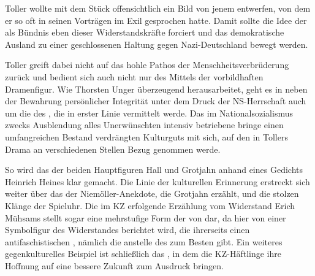 Toller wollte mit dem Stück offensichtlich ein Bild von jenem  entwerfen, von dem er so oft in seinen Vorträgen im Exil gesprochen
hatte.
Damit sollte die Idee der \Cite{Volksfront} als Bündnis eben dieser Widerstandskräfte
forciert und das demokratische Ausland zu einer geschlossenen Haltung gegen
Nazi-Deutschland bewegt werden.

Toller greift dabei nicht auf das hohle Pathos der Menschheitsverbrüderung
zurück und bedient sich auch nicht nur des Mittels der vorbildhaften
Dramenfigur. Wie Thorsten Unger überzeugend herausarbeitet, geht es in
 neben der Bewahrung persönlicher Integrität unter dem
Druck der NS-Herrschaft auch um die \Cite{kulturelle Integrität} des
, die in erster Linie \Cite{auf dem Wege der
  intertextuellen Erinnerung} vermittelt werde.
 Das im Nationalsozialismus
zwecks Ausblendung alles Unerwünschten intensiv betriebene \Cite{kulturelle
  Vergessen} bringe einen umfangreichen Bestand verdrängten Kulturguts mit
sich, auf den in Tollers Drama an verschiedenen Stellen Bezug genommen werde. 

So wird das \Cite{kritische Einverständnis} der beiden Hauptfiguren Hall und
Grotjahn anhand eines \Cite{verbotenen} Gedichts Heinrich Heines klar gemacht. Die
Linie der kulturellen Erinnerung erstreckt sich weiter über das
\Cite{subversive Potential} der Niemöller-Anekdote, die Grotjahn erzählt,
und die stolzen Klänge der Spieluhr. Die im KZ
erfolgende Erzählung vom Widerstand Erich Mühsams stellt sogar eine
mehrstufige Form der \Cite{Vergegenwärtigung} von \Cite{Gegenkultur} dar, da
hier von einer Symbolfigur des Widerstandes berichtet wird, die ihrerseits
einen antifaschistischen \Cite{Schlüsseltext}, nämlich die
 anstelle des  zum Besten
gibt. Ein weiteres gegenkulturelles Beispiel ist schließlich das
\Cite{Moorsoldatenlied}, in dem die KZ-Häftlinge ihre Hoffnung auf eine
bessere Zukunft zum Ausdruck bringen.


